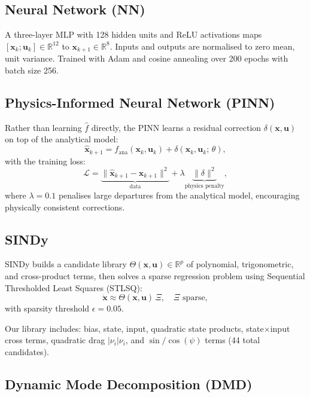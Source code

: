 \documentclass[conference]{IEEEtran}
\newcommand{\vx}{\mathbf{x}}
\newcommand{\vu}{\mathbf{u}}
\newcommand{\Rn}[1]{\mathbb{R}^{#1}}
\begin{document}
\subsection{Neural Network (NN)}

A three-layer MLP with 128 hidden units and ReLU activations maps
$[\vx_k; \vu_k] \in \Rn{12}$ to $\vx_{k+1} \in \Rn{8}$. Inputs and
outputs are normalised to zero mean, unit variance. Trained with Adam
and cosine annealing over 200 epochs with batch size 256.

\subsection{Physics-Informed Neural Network (PINN)}

Rather than learning $\hat{f}$ directly, the PINN learns a residual
correction $\delta(\vx, \vu)$ on top of the analytical model:
\begin{equation}
  \hat{\vx}_{k+1} = f_{\text{ana}}(\vx_k, \vu_k) + \delta(\vx_k, \vu_k;\, \theta),
\end{equation}
with the training loss:
\begin{equation}
  \mathcal{L} = \underbrace{\|\hat{\vx}_{k+1} - \vx_{k+1}\|^2}_{\text{data}}
              + \lambda \underbrace{\|\delta\|^2}_{\text{physics~penalty}},
\end{equation}
where $\lambda = 0.1$ penalises large departures from the analytical model,
encouraging physically consistent corrections.

\subsection{SINDy}

SINDy builds a candidate library $\Theta(\vx,\vu) \in \Rn{p}$ of
polynomial, trigonometric, and cross-product terms, then solves a
sparse regression problem using Sequential Thresholded Least Squares (STLSQ):
\begin{equation}
  \dot{\vx} \approx \Theta(\vx,\vu)\, \Xi, \quad \Xi \text{ sparse},
\end{equation}
with sparsity threshold $\epsilon = 0.05$.

Our library includes: bias, state, input, quadratic state products,
state$\times$input cross terms, quadratic drag $|\nu_i|\nu_i$,
and $\sin/\cos(\psi)$ terms (44 total candidates).

\subsection{Dynamic Mode Decomposition (DMD)}
\end{document}
